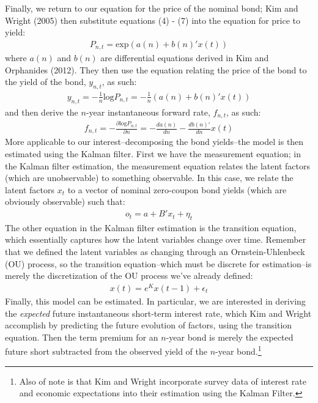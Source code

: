 \documentclass[12pt,final]{article}
\begin{document}
Finally, we return to our equation for the price of the nominal bond; Kim and Wright (2005) then substitute equations (4) - (7) into the equation for price to yield:
\begin{gather}
	P_{n,t} = \text{exp}(a(n) + b(n)'x(t))
\end{gather}
where $a(n)$ and $b(n)$ are differential equations derived in Kim and Orphanides (2012). \citep{Kim2012} They then use the equation relating the price of the bond to the yield of the bond, $y_{n,t}$, as such:
\begin{gather}
	y_{n,t} = -\frac{1}{n}\text{log}P_{n,t} = - \frac{1}{n}(a(n) + b(n)'x(t))
\end{gather}
and then derive the $n$-year instantaneous forward rate, $f_{n,t}$, as such:
\begin{gather}
	f_{n,t} = - \frac{\partial\text{log}P_{n,t}}{\partial n} = - \frac{da(n)}{dn} - \frac{db(n)'}{dn}x(t)
\end{gather}
More applicable to our interest--decomposing the bond yields--the model is then estimated using the Kalman filter. First we have the measurement equation; in the Kalman filter estimation, the measurement equation relates the latent factors (which are unobservable) to something observable. \citep{Welch1995} In this case, we relate the latent factors $x_t$ to a vector of nominal zero-coupon bond yields (which are obviously observable) such that:
\begin{gather}
	o_t = a + B'x_t + \eta_t
\end{gather}
The other equation in the Kalman filter estimation is the transition equation, which essentially captures how the latent variables change over time. \citep{Welch1995} Remember that we defined the latent variables as changing through an Ornstein-Uhlenbeck (OU) process, so the transition equation--which must be discrete for estimation--is merely the discretization of the OU process we've already defined:
\begin{gather}
	x(t) = e^K x(t-1) + \epsilon_t
\end{gather}
Finally, this model can be estimated. In particular, we are interested in deriving the \textit{expected} future instantaneous short-term interest rate, which Kim and Wright accomplish by predicting the future evolution of factors, using the transition equation. Then the term premium for an $n$-year bond is merely the expected future short subtracted from the observed yield of the $n$-year bond.\footnote{Also of note is that Kim and Wright incorporate survey data of interest rate and economic expectations into their estimation using the Kalman Filter.}
\end{document}
